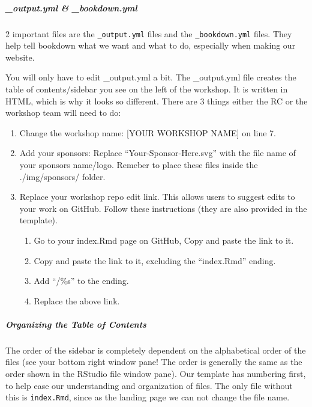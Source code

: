 \documentclass[
]{book}
\providecommand{\tightlist}{%
  \setlength{\itemsep}{0pt}\setlength{\parskip}{0pt}}
\theoremstyle{definition}
\theoremstyle{definition}
\theoremstyle{definition}
\theoremstyle{definition}
\theoremstyle{remark}
\begin{document}
\subparagraph*{\_output.yml \& \_bookdown.yml}\label{output.yml-_bookdown.yml}

2 important files are the \texttt{\_output.yml} files and the \texttt{\_bookdown.yml} files. They help tell bookdown what we want and what to do, especially when making our website.

You will only have to edit \_output.yml a bit. The \_output.yml file creates the table of contents/sidebar you see on the left of the workshop. It is written in HTML, which is why it looks so different. There are 3 things either the RC or the workshop team will need to do:

\begin{enumerate}
\def\labelenumi{\arabic{enumi}.}
\item
  Change the workshop name: {[}YOUR WORKSHOP NAME{]} on line 7.
\item
  Add your sponsors: Replace ``Your-Sponsor-Here.svg'' with the file name of your sponsors name/logo. Remeber to place these files inside the ./img/sponsors/ folder.
\item
  Replace your workshop repo edit link. This allows users to suggest edits to your work on GitHub. Follow these instructions (they are also provided in the template).

  \begin{enumerate}
  \def\labelenumii{\arabic{enumii}.}
  \tightlist
  \item
    Go to your index.Rmd page on GitHub, Copy and paste the link to it.
  \item
    Copy and paste the link to it, excluding the ``index.Rmd'' ending.
  \item
    Add ``/\%s'' to the ending.
  \item
    Replace the above link.
  \end{enumerate}
\end{enumerate}

\subparagraph*{Organizing the Table of Contents}\label{organizing-the-table-of-contents}

The order of the sidebar is completely dependent on the alphabetical order of the files (see your bottom right window pane! The order is generally the same as the order shown in the RStudio file window pane). Our template has numbering first, to help ease our understanding and organization of files. The only file without this is \texttt{index.Rmd}, since as the landing page we can not change the file name.
\end{document}
